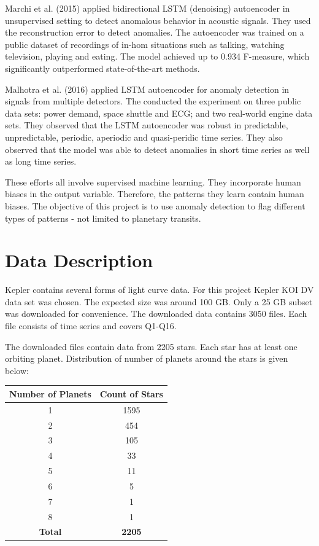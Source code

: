 \documentclass[%
aip,
amsmath,amssymb,
reprint,%
]{revtex4-1}
\begin{document}
Marchi et al. (2015) applied bidirectional LSTM (denoising) autoencoder in unsupervised setting to detect anomalous behavior in acoustic signals. They used the reconstruction error to detect anomalies. The autoencoder was trained on a public dataset of recordings of in-hom situations such as talking, watching television, playing and eating. The model achieved up to 0.934 F-measure, which significantly outperformed state-of-the-art methods.

Malhotra et al. (2016) applied LSTM autoencoder for anomaly detection in signals from multiple detectors. The conducted the experiment on three public data sets: power demand, space shuttle and ECG; and two real-world engine data sets. They observed that the LSTM autoencoder was robust in predictable, unpredictable, periodic, aperiodic and quasi-peridic time series. They also observed that the model was able to detect anomalies in short time series as well as long time series.

These efforts all involve supervised machine learning. They incorporate human biases in the output variable. Therefore, the patterns they learn contain human biases. The objective of this project is to use anomaly detection to flag different types of patterns - not limited to planetary transits.

\section{Data Description}

Kepler contains several forms of light curve data. For this project Kepler KOI DV data set was chosen. The expected size was around 100 GB. Only a 25 GB subset was downloaded for convenience. The downloaded data contains 3050 files. Each file consists of time series and covers Q1-Q16.

The downloaded files contain data from 2205 stars. Each star has at least one orbiting planet. Distribution of number of planets around the stars is given below:

\begin{center}
 \begin{tabular}{| c | c |} 
 \hline
 \textbf{Number of Planets} & \textbf{Count of Stars}\\ [0.5 ex]
 \hline
 1 & 1595 \\ 
 \hline
 2 & 454 \\
 \hline
 3 & 105 \\
 \hline
 4 & 33 \\
 \hline
 5 & 11 \\
 \hline
 6 & 5 \\
 \hline
 7 & 1 \\
 \hline
 8 & 1 \\
 \hline
 \textbf{Total} & \textbf{2205} \\ [1ex] 
 \hline
\end{tabular}
\end{center}
\end{document}
